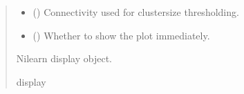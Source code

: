 \documentclass[letterpaper,10pt,english]{sphinxhowto}
\begin{document}
\begin{fulllineitems}
\begin{quote}
\begin{description}
\begin{itemize}
\item {} 
\sphinxAtStartPar
{} (\sphinxstyleliteralemphasis{\sphinxupquote{, }}) \textendash{} Connectivity used for cluster\sphinxhyphen{}size thresholding.

\item {} 
\sphinxAtStartPar
{} (\sphinxstyleliteralemphasis{\sphinxupquote{, }}) \textendash{} Whether to show the plot immediately.

\end{itemize}

\sphinxAtStartPar
Nilearn display object.

\sphinxAtStartPar
display

\end{description}\end{quote}

\end{fulllineitems}

\end{document}
